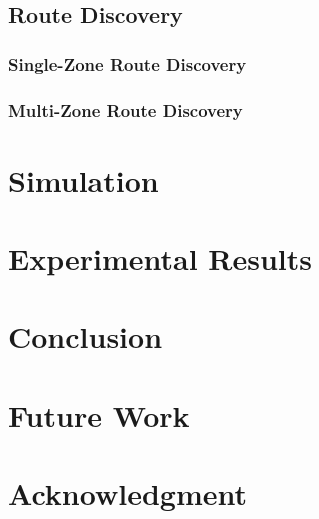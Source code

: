 \documentclass[conference]{IEEEtran}
\begin{document}

\subsection{Route Discovery}

\subsubsection{Single-Zone Route Discovery}

\subsubsection{Multi-Zone Route Discovery}

\section{Simulation}

\section{Experimental Results} %

\section{Conclusion} %

\section{Future Work} %

\section*{Acknowledgment}

\begin{thebibliography}{1}
\bibitem{}
\end{thebibliography}
\end{document}
